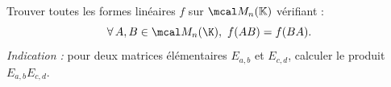 Trouver toutes les formes linéaires $f$ sur $\mcal M_n(\mathbb K)$ vérifiant :
\begin{equation*}
    \forall\,A,B \in \mcal M_n(\K),~ f(AB) = f(BA).
\end{equation*}
\emph{Indication :} pour deux matrices élémentaires $E_{a,b}$ et $E_{c,d}$, calculer le produit $E_{a,b}E_{c,d}$.
